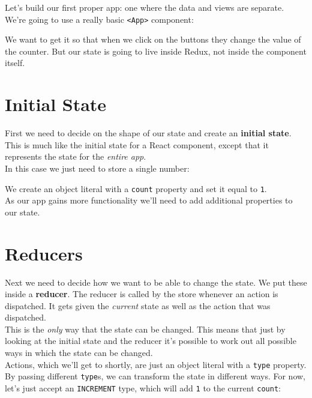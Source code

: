 \hr

Let's build our first proper app: one where the data and views are separate. We're going to use a really basic \texttt{<App>} component:


We want to get it so that when we click on the buttons they change the value of the counter. But our state is going to live inside Redux, not inside the component itself.


\section{Initial State}

First we need to decide on the shape of our state and create an \textbf{initial state}. This is much like the initial state for a React component, except that it represents the state for the \textit{entire app}.
\\

In this case we just need to store a single number:


We create an object literal with a \texttt{count} property and set it equal to \texttt{1}.
\\

As our app gains more functionality we'll need to add additional properties to our state.



\section{Reducers}

Next we need to decide how we want to be able to change the state. We put these inside a \textbf{reducer}. The reducer is called by the store whenever an action is dispatched. It gets given the \textit{current} state as well as the action that was dispatched.
\\

This is the \textit{only} way that the state can be changed. This means that just by looking at the initial state and the reducer it's possible to work out all possible ways in which the state can be changed.
\\

Actions, which we'll get to shortly, are just an object literal with a \texttt{type} property. By passing different \texttt{type}s, we can transform the state in different ways. For now, let's just accept an \texttt{INCREMENT} type, which will add \texttt{1} to the current \texttt{count}:

